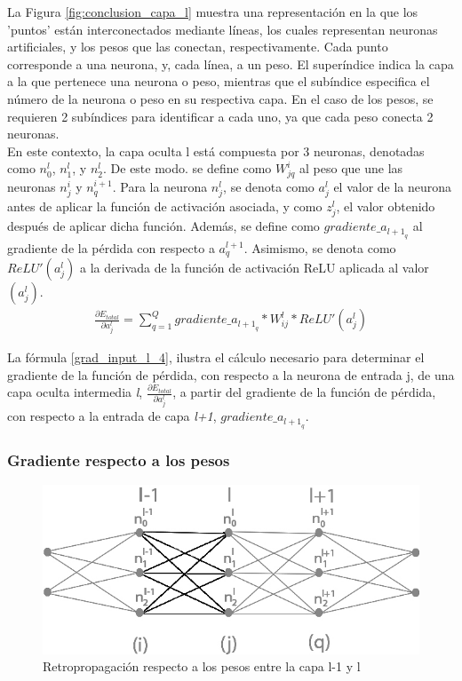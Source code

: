 La Figura \ref{fig:conclusion_capa_l} muestra una representación en la que los 'puntos' están interconectados mediante líneas, los cuales representan neuronas artificiales, y los pesos que las conectan, respectivamente. Cada punto corresponde a una neurona, y, cada línea, a un peso. El superíndice indica la capa a la que pertenece una neurona o peso, mientras que el subíndice especifica el número de la neurona o peso en su respectiva capa. En el caso de los pesos, se requieren 2 subíndices para identificar a cada uno, ya que cada peso conecta 2 neuronas. \\
En este contexto, la capa oculta l está compuesta por 3 neuronas, denotadas como $n^{l}_0$, $n^{l}_1$, y $n^{l}_2$. De este modo. se define como $W^{i}_{jq}$ al peso que une las neuronas $n^{i}_j$ y $n^{i+1}_q$. 
Para la neurona $n^l_j$, se denota como $a^l_j$ el valor de la neurona antes de aplicar la función de activación asociada, y como $z^l_j$, el valor obtenido después de aplicar dicha función. 
Además, se define como $gradiente\_a_{{l+1}_q}$ al gradiente de la pérdida con respecto a $a^{l+1}_q$. Asimismo, se denota como $ReLU'(a^l_j)$ a la derivada de la función de activación ReLU aplicada al valor $(a^l_j)$.\\

\begin{gather}
	\frac{\partial E_{total}}{\partial a^l_j} = \sum_{q=1}^Q  gradiente\_a_{{l+1}_q} * W^l_{ij} * ReLU'(a^l_j) \label{grad_input_l_4}
\end{gather}

La fórmula \ref{grad_input_l_4}, ilustra el cálculo necesario para determinar el gradiente de la función de pérdida, con respecto a la neurona de entrada j, de una capa oculta intermedia \textit{l}, $\frac{\partial E_{total}}{\partial a^l_j}$, a partir del gradiente de la función de pérdida, con respecto a la entrada de capa \textit{l+1}, $gradiente\_a_{{l+1}_q}$.


\subsubsection{Gradiente respecto a los pesos}

\begin{figure}[H]
	\centering
	\includegraphics[scale=0.35]{imagenes/conclusion_pesos.jpg}  
	\caption{Retropropagación respecto a los pesos entre la capa l-1 y l}
	\label{fig:conclusion_pesos}
\end{figure}

